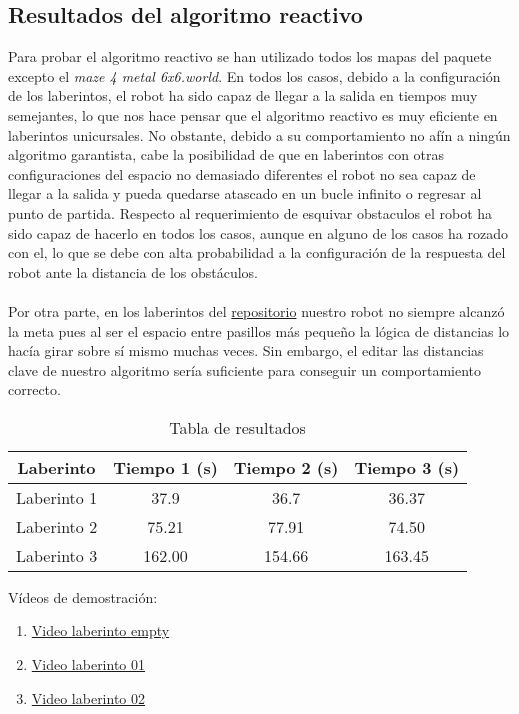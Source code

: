 \documentclass[a4paper,9pt]{article}
\begin{document}
\subsection{Resultados del algoritmo reactivo}
Para probar el algoritmo reactivo se han utilizado todos los mapas del paquete excepto el \textit{maze 4 metal 6x6.world}.
En todos los casos, debido a la configuración de los laberintos, el robot ha sido capaz de llegar 
a la salida en tiempos muy semejantes, lo que nos hace pensar que el algoritmo reactivo es muy eficiente en laberintos unicursales. No obstante, debido a su comportamiento no afín a 
ningún algoritmo garantista, cabe la posibilidad de que en laberintos con otras configuraciones del espacio no demasiado diferentes el robot no sea capaz de llegar a la salida y pueda 
quedarse atascado en un bucle infinito o regresar al punto de partida. Respecto al requerimiento de esquivar obstaculos el robot ha sido capaz de hacerlo en todos los casos, aunque en 
alguno de los casos ha rozado con el, lo que se debe con alta probabilidad a la configuración de la respuesta del robot ante la distancia de los obstáculos. 
\paragraph{}
Por otra parte, en los laberintos del \href{https://github.com/rfzeg/plywood_mazes}{repositorio} nuestro robot no siempre alcanzó la 
meta pues al ser el espacio entre pasillos más pequeño la lógica de distancias lo hacía girar sobre sí mismo muchas veces.
Sin embargo, el editar las distancias clave de nuestro algoritmo sería suficiente para conseguir un comportamiento correcto.
\begin{table}[h!]
    \centering
    \begin{tabular}{|c|c|c|c|}
        \hline
        \textbf{Laberinto} & \textbf{Tiempo 1 (s)} & \textbf{Tiempo 2 (s)} & \textbf{Tiempo 3 (s)} \\
        \hline
        Laberinto 1 & 37.9 & 36.7 & 36.37 \\
        \hline
        Laberinto 2 & 75.21 & 77.91 & 74.50 \\
        \hline
        Laberinto 3 & 162.00 & 154.66 & 163.45 \\
        \hline
    \end{tabular}
    \caption{Tabla de resultados}
    \label{tabla:resultados}
\end{table}


Vídeos de demostración:
\begin{enumerate}
    \item\href{https://youtu.be/u6S0vK1PFoI}{Video laberinto empty}
    \item\href{https://www.youtube.com/watch?v=it0r5Ylg6to&ab_channel=Kit0s}{Video laberinto 01}
    \item\href{https://www.youtube.com/watch?v=SlumQXdpNc8&ab_channel=Kit0s}{Video laberinto 02}
\end{enumerate}
\end{document}
